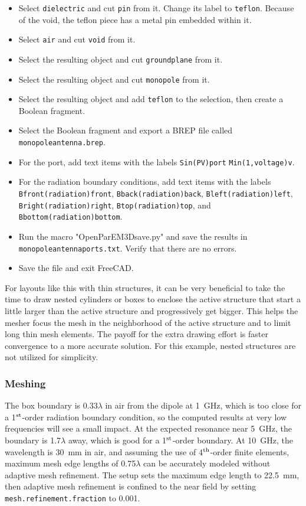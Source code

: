 \documentclass[titlepage]{article}
\renewcommand\_{\textunderscore\linebreak[1]}
\begin{document}
\begin{itemize}
\item Select \texttt{dielectric} and cut \texttt{pin} from it.  Change its label to \texttt{teflon}.  Because of the void, the teflon piece has a metal pin embedded within it.
\item Select \texttt{air} and cut \texttt{void} from it.
\item Select the resulting object and cut \texttt{groundplane} from it.
\item Select the resulting object and cut \texttt{monopole} from it.
\item Select the resulting object and add \texttt{teflon} to the selection, then create a Boolean fragment.
\item Select the Boolean fragment and export a BREP file called \texttt{monopole\_antenna.brep}.
\item For the port, add text items with the labels \texttt{\_Sin(PV){port}} \texttt{\_Min(1,voltage){v}}.
\item For the radiation boundary conditions, add text items with the labels \texttt{\_Bfront(radiation){front}}, \newline\texttt{\_Bback(radiation){back}}, \texttt{\_Bleft(radiation){left}}, \texttt{\_Bright(radiation){right}}, \newline\texttt{\_Btop(radiation){top}}, and \texttt{\_Bbottom(radiation){bottom}}.
\item Run the macro "OpenParEM3D\_save.py" and save the results in \texttt{monopole\_antenna\_ports.txt}.  Verify that there are no errors.
\item Save the file and exit FreeCAD.
\end{itemize}

For layouts like this with thin structures, it can be very beneficial to take the time to draw nested cylinders or boxes to enclose the active structure that start a little larger than the active structure and progressively get bigger.  This helps the mesher focus the mesh in the neighborhood of the active structure and to limit long thin mesh elements.  The payoff for the extra drawing effort is faster convergence to a more accurate solution.  For this example, nested structures are not utilized for simplicity.

\subsubsection{Meshing}

The box boundary is 0.33$\lambda$ in air from the dipole at 1~GHz, which is too close for a 1$^{\textnormal{st}}$-order radiation boundary condition, so the computed results at very low frequencies will see a small impact.  At the expected resonance near 5~GHz, the boundary is 1.7$\lambda$ away, which is good for a 1$^{\textnormal{st}}$-order boundary.  At 10~GHz, the wavelength is 30~mm in air, and assuming the use of 4$^{\textnormal{th}}$-order finite elements, maximum mesh edge lengths of 0.75$\lambda$ can be accurately modeled without adaptive mesh refinement.  The setup sets the maximum edge length to 22.5~mm, then adaptive mesh refinement is confined to the near field by setting \texttt{mesh.refinement.fraction} to 0.001.
\end{document}
